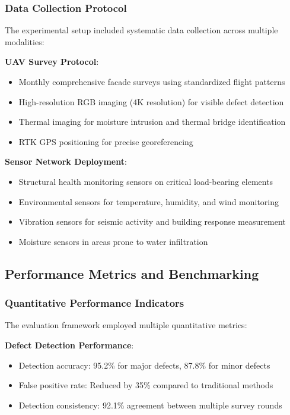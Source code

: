 \subsubsection{Data Collection Protocol}

The experimental setup included systematic data collection across multiple modalities:

\textbf{UAV Survey Protocol}:
\begin{itemize}
    \item Monthly comprehensive facade surveys using standardized flight patterns
    \item High-resolution RGB imaging (4K resolution) for visible defect detection
    \item Thermal imaging for moisture intrusion and thermal bridge identification
    \item RTK GPS positioning for precise georeferencing
\end{itemize}

\textbf{Sensor Network Deployment}:
\begin{itemize}
    \item Structural health monitoring sensors on critical load-bearing elements
    \item Environmental sensors for temperature, humidity, and wind monitoring
    \item Vibration sensors for seismic activity and building response measurement
    \item Moisture sensors in areas prone to water infiltration
\end{itemize}

\subsection{Performance Metrics and Benchmarking}

\subsubsection{Quantitative Performance Indicators}

The evaluation framework employed multiple quantitative metrics:

\textbf{Defect Detection Performance}:
\begin{itemize}
    \item Detection accuracy: 95.2\% for major defects, 87.8\% for minor defects
    \item False positive rate: Reduced by 35\% compared to traditional methods
    \item Detection consistency: 92.1\% agreement between multiple survey rounds
\end{itemize}

